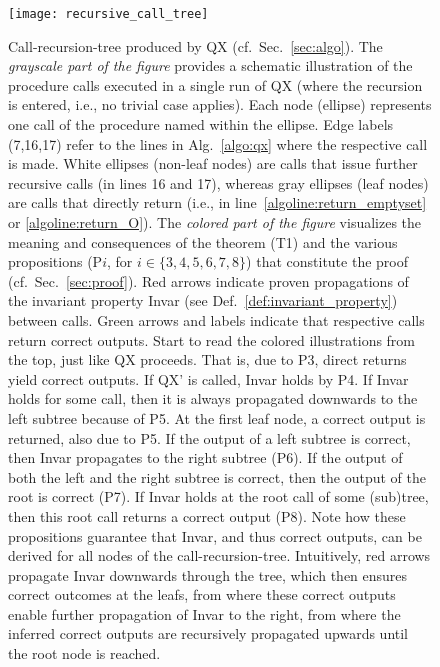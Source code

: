 \documentclass[]{elsarticle}
\begin{document}
	\begin{figure}
		\centering
		\texttt{[image: recursive\_call\_tree]}
		\caption{Call-recursion-tree produced by QX (cf.\ Sec.~\ref{sec:algo}). The \emph{grayscale part of the figure} provides a schematic illustration of the procedure calls executed in a single run of QX (where the recursion is entered, i.e., no trivial case applies). Each node (ellipse) represents one call of the procedure named within the ellipse. Edge labels (7,16,17) refer to the lines in Alg.~\ref{algo:qx} where the respective call is made. White ellipses (non-leaf nodes) are calls that issue further recursive calls (in lines 16 and 17), whereas gray ellipses (leaf nodes) are calls that directly return (i.e., in line~\ref{algoline:return_emptyset} or \ref{algoline:return_O}). The \emph{colored part of the figure} visualizes the meaning and consequences of the theorem (T1) and the various propositions (P$i$, for $i\in\{3,4,5,6,7,8\}$) that constitute the proof (cf.\ Sec.~\ref{sec:proof}). {\color{red}Red arrows} indicate proven propagations of the invariant property {\color{red} Invar} (see Def.~\ref{def:invariant_property}) between calls. {\color{darkgreen} Green arrows 
				and labels} indicate that respective calls return {\color{darkgreen} correct outputs}. Start to read the colored illustrations from the top, just like QX proceeds. That is, due to P3, direct returns yield correct outputs. If QX' is called, Invar 
			holds by P4. If Invar holds for some call, then it is always propagated downwards to the left subtree because of P5. At the first leaf node, a correct output is returned, also due to P5. If the output of a left subtree is correct, then Invar propagates to the right subtree (P6). If the output of both the left and the right subtree is correct, then the output of the root is correct (P7). If Invar holds at the root call of some (sub)tree, then this root call returns a correct output (P8). Note how these propositions guarantee that Invar, and thus correct outputs, can be derived for all nodes of the call-recursion-tree. Intuitively, red arrows propagate Invar downwards through the tree, which then ensures correct outcomes at the leafs, from where these correct outputs enable further propagation of Invar to the right, from where the inferred correct outputs are recursively propagated upwards until the root node is reached.}
		\label{fig:call_tree}
	\end{figure}
	
\end{document}
